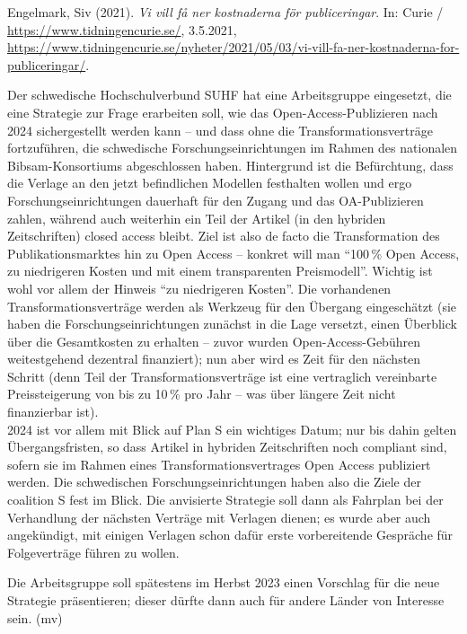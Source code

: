 \documentclass[a4paper,
fontsize=11pt,
oneside,
numbers=noperiodatend,
parskip=half-,
bibliography=totoc,
final
]{scrartcl}
\begin{document}
Engelmark, Siv (2021). \emph{Vi vill få ner kostnaderna för
publiceringar}. In: Curie / \url{https://www.tidningencurie.se/},
3.5.2021,
\url{https://www.tidningencurie.se/nyheter/2021/05/03/vi-vill-fa-ner-kostnaderna-for-publiceringar/}.

Der schwedische Hochschulverbund SUHF hat eine Arbeitsgruppe eingesetzt,
die eine Strategie zur Frage erarbeiten soll, wie das
Open-Access-Publizieren nach 2024 sichergestellt werden kann -- und dass
ohne die Transformationsverträge fortzuführen, die schwedische
Forschungseinrichtungen im Rahmen des nationalen Bibsam-Konsortiums
abgeschlossen haben. Hintergrund ist die Befürchtung, dass die Verlage
an den jetzt befindlichen Modellen festhalten wollen und ergo
Forschungseinrichtungen dauerhaft für den Zugang und das OA-Publizieren
zahlen, während auch weiterhin ein Teil der Artikel (in den hybriden
Zeitschriften) closed access bleibt. Ziel ist also de facto die
Transformation des Publikationsmarktes hin zu Open Access -- konkret
will man \enquote{100\,\% Open Access, zu niedrigeren Kosten und mit
einem transparenten Preismodell}. Wichtig ist wohl vor allem der Hinweis
\enquote{zu niedrigeren Kosten}. Die vorhandenen Transformationsverträge
werden als Werkzeug für den Übergang eingeschätzt (sie haben die
Forschungseinrichtungen zunächst in die Lage versetzt, einen Überblick
über die Gesamtkosten zu erhalten -- zuvor wurden Open-Access-Gebühren
weitestgehend dezentral finanziert); nun aber wird es Zeit für den
nächsten Schritt (denn Teil der Transformationsverträge ist eine
vertraglich vereinbarte Preissteigerung von bis zu 10\,\% pro Jahr --
was über längere Zeit nicht finanzierbar ist).\\
2024 ist vor allem mit Blick auf Plan S ein wichtiges Datum; nur bis
dahin gelten Übergangsfristen, so dass Artikel in hybriden Zeitschriften
noch compliant sind, sofern sie im Rahmen eines Transformationsvertrages
Open Access publiziert werden. Die schwedischen Forschungseinrichtungen
haben also die Ziele der coalition S fest im Blick. Die anvisierte
Strategie soll dann als Fahrplan bei der Verhandlung der nächsten
Verträge mit Verlagen dienen; es wurde aber auch angekündigt, mit
einigen Verlagen schon dafür erste vorbereitende Gespräche für
Folgeverträge führen zu wollen.

Die Arbeitsgruppe soll spätestens im Herbst 2023 einen Vorschlag für die
neue Strategie präsentieren; dieser dürfte dann auch für andere Länder
von Interesse sein. (mv)

\pagebreak
\end{document}
